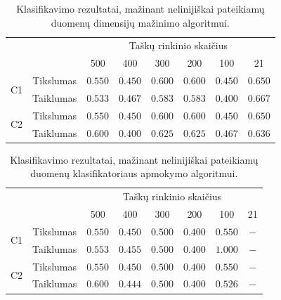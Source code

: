 \documentclass[]{vgtuef}
\begin{document}
\begin{table}
	\centering
	\caption{Klasifikavimo rezultatai, mažinant nelinijiškai pateikiamų duomenų dimensijų mažinimo algoritmui.}
	\label{table:second_phase_not_linear_experiment}
	\begin{tabular}{|c|c|c|c|c|c|c|c|} \hline
			& & \multicolumn{6}{c|}{Taškų rinkinio skaičius} \\ \cline{3-8}
						&	& 500 	& 400	& 300 	& 200 & 100 	& 21 	\\ \hline
		\multirow{2}{*}{C1}
		& Tikslumas & $0.550$ & $0.450$ & $0.600$ & $0.600$ & $0.450$ & $\mathbf{0.650}$ \\ \cline{2-8}
		& Taiklumas &	$0.533$ & $0.467$ & $0.583$ & $0.583$ & $0.400$ & $\mathbf{0.667}$ \\ \hline
		\multirow{2}{*}{C2}
		& Tikslumas	& $0.550$ & $0.450$ & $0.600$ & $0.600$ & $0.450$ & $\mathbf{0.650}$ \\ \cline{2-8}
		& Taiklumas  &	$0.600$ & $0.400$ & $0.625$ & $0.625$ & $0.467$ & $\mathbf{0.636}$ \\ \hline
	\end{tabular}
\end{table}

\begin{table}
	\centering
	\caption{Klasifikavimo rezultatai, mažinant nelinijiškai pateikiamų duomenų klasifikatoriaus apmokymo algoritmui.}
	\label{table:second_phase_not_linear_experiment}
	\begin{tabular}{|c|c|c|c|c|c|c|c|} \hline
			& & \multicolumn{6}{c|}{Taškų rinkinio skaičius} \\ \cline{3-8}
						&	& 500 	& 400	& 300 	& 200 & 100 	& 21 	\\ \hline
		\multirow{2}{*}{C1}
		& Tikslumas	& $0.550$ & $0.450$ & $0.500$ & $0.400$ & $\mathbf{0.550}$ & $-$ \\ \cline{2-8}
		& Taiklumas  &	$0.553$ & $0.455$ & $0.500$ & $0.400$ & $\mathbf{1.000}$ & $-$ \\ \hline
		\multirow{2}{*}{C2}
		& Tikslumas	& $0.550$ & $0.450$ & $0.500$ & $0.400$ & $\mathbf{0.550}$ & $-$ \\ \cline{2-8}
		& Taiklumas  &	$0.600$ & $0.444$ & $0.500$ & $0.400$ & $\mathbf{0.526}$ & $-$ \\ \hline
	\end{tabular}
\end{table}
\end{document}
